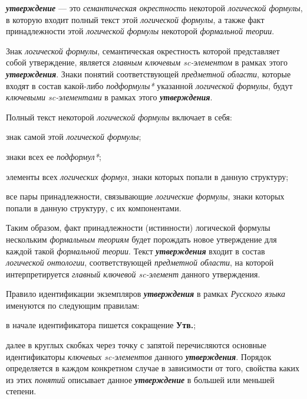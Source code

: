\textbf{\textit{утверждение}} --- это \textit{семантическая окрестность} некоторой \textit{логической формулы}, в которую входит полный текст этой \textit{логической формулы}, а также факт принадлежности этой \textit{логической формулы} некоторой \textit{формальной теории}.

Знак \textit{логической формулы}, семантическая окрестность которой представляет собой утверждение, является \textit{главным ключевым sc-элементом\scnrolesign} в рамках этого \textbf{\textit{утверждения}}. Знаки понятий соответствующей \textit{предметной области}, которые входят в состав какой-либо \textit{подформулы*} указанной \textit{логической формулы}, будут \textit{ключевыми sc-элементами\scnrolesign} в рамках этого \textbf{\textit{утверждения}}.
	
Полный текст некоторой \textit{логической формулы} включает в себя:
\begin{textitemize}
	\item{знак самой этой \textit{логической формулы}};
	\item{знаки всех ее \textit{подформул*}};
	\item{элементы всех \textit{логических формул}, знаки которых попали в данную структуру;}
	\item{все пары принадлежности, связывающие \textit{логические формулы}, знаки которых попали в данную структуру, с их компонентами.}
\end{textitemize}

Таким образом, факт принадлежности (истинности) логической формулы нескольким \textit{формальным теориям} будет порождать новое утверждение для каждой такой \textit{формальной теории}. Текст \textbf{\textit{утверждения}} входит в состав \textit{логической онтологии}, соответствующей \textit{предметной области}, на которой интерпретируется \textit{главный ключевой sc-элемент\scnrolesign} данного утверждения.

Правило идентификации экземпляров \textbf{\textit{утверждения}} в рамках \textit{Русского языка} именуются по следующим правилам:
\begin{textitemize}
	\item{в начале идентификатора пишется сокращение \textbf{Утв.};}
	\item{далее в круглых скобках через точку с запятой перечисляются основные идентификаторы \textit{ключевых \mbox{sc-элементов}\scnrolesign} данного \textbf{\textit{утверждения}}. Порядок определяется в каждом конкретном случае в зависимости от того, свойства каких из этих \textit{понятий} описывает данное \textbf{\textit{утверждение}} в большей или меньшей степени.}
\end{textitemize}

